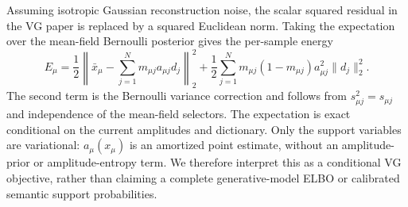 Assuming isotropic Gaussian reconstruction noise, the scalar squared residual
in the VG paper is replaced by a squared Euclidean norm. Taking the expectation
over the mean-field Bernoulli posterior gives the per-sample energy
\begin{equation}
    E_\mu
    =
    \frac{1}{2}
    \left\|
        \bar x_\mu
        -
        \sum_{j=1}^{N}m_{\mu j}a_{\mu j}d_j
    \right\|_2^2
    +
    \frac{1}{2}
    \sum_{j=1}^{N}
        m_{\mu j}(1-m_{\mu j})a_{\mu j}^2\|d_j\|_2^2 .
    \label{eq:vg_sae_energy}
\end{equation}
The second term is the Bernoulli variance correction and follows from
$s_{\mu j}^2=s_{\mu j}$ and independence of the mean-field selectors.
The expectation is exact conditional on the current amplitudes and dictionary.
Only the support variables are variational: $a_\mu(x_\mu)$ is an amortized point
estimate, without an amplitude-prior or amplitude-entropy term. We therefore
interpret this as a conditional VG objective, rather than claiming a complete
generative-model ELBO or calibrated semantic support probabilities.


